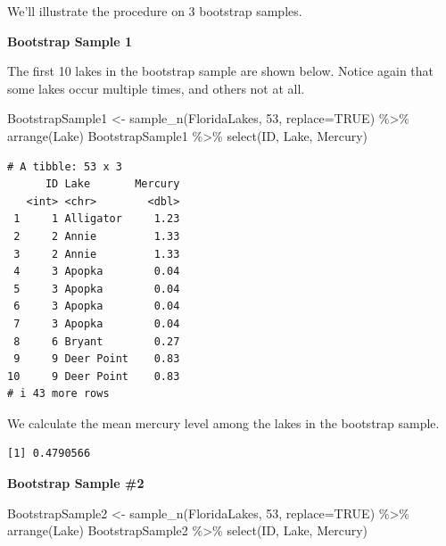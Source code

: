 \documentclass[
  letterpaper,
  DIV=11,
  numbers=noendperiod]{scrreprt}
\newenvironment{Shaded}{\begin{snugshade}}{\end{snugshade}}
\newcommand{\AttributeTok}[1]{\textcolor[rgb]{0.40,0.45,0.13}{#1}}
\newcommand{\ConstantTok}[1]{\textcolor[rgb]{0.56,0.35,0.01}{#1}}
\newcommand{\DecValTok}[1]{\textcolor[rgb]{0.68,0.00,0.00}{#1}}
\newcommand{\FunctionTok}[1]{\textcolor[rgb]{0.28,0.35,0.67}{#1}}
\newcommand{\NormalTok}[1]{\textcolor[rgb]{0.00,0.23,0.31}{#1}}
\newcommand{\OtherTok}[1]{\textcolor[rgb]{0.00,0.23,0.31}{#1}}
\newcommand{\SpecialCharTok}[1]{\textcolor[rgb]{0.37,0.37,0.37}{#1}}
\begin{document}
We'll illustrate the procedure on 3 bootstrap samples.

\textbf{Bootstrap Sample 1}

The first 10 lakes in the bootstrap sample are shown below. Notice again
that some lakes occur multiple times, and others not at all.

\begin{Shaded}
\begin{Highlighting}[]
\NormalTok{BootstrapSample1 }\OtherTok{\textless{}{-}} \FunctionTok{sample\_n}\NormalTok{(FloridaLakes, }\DecValTok{53}\NormalTok{, }\AttributeTok{replace=}\ConstantTok{TRUE}\NormalTok{) }\SpecialCharTok{\%\textgreater{}\%} \FunctionTok{arrange}\NormalTok{(Lake)}
\NormalTok{BootstrapSample1 }\SpecialCharTok{\%\textgreater{}\%} \FunctionTok{select}\NormalTok{(ID, Lake, Mercury)}
\end{Highlighting}
\end{Shaded}

\begin{verbatim}
# A tibble: 53 x 3
      ID Lake       Mercury
   <int> <chr>        <dbl>
 1     1 Alligator     1.23
 2     2 Annie         1.33
 3     2 Annie         1.33
 4     3 Apopka        0.04
 5     3 Apopka        0.04
 6     3 Apopka        0.04
 7     3 Apopka        0.04
 8     6 Bryant        0.27
 9     9 Deer Point    0.83
10     9 Deer Point    0.83
# i 43 more rows
\end{verbatim}

We calculate the mean mercury level among the lakes in the bootstrap
sample.

\begin{Shaded}
\end{Shaded}

\begin{verbatim}
[1] 0.4790566
\end{verbatim}

\textbf{Bootstrap Sample \#2}

\begin{Shaded}
\begin{Highlighting}[]
\NormalTok{BootstrapSample2 }\OtherTok{\textless{}{-}} \FunctionTok{sample\_n}\NormalTok{(FloridaLakes, }\DecValTok{53}\NormalTok{, }\AttributeTok{replace=}\ConstantTok{TRUE}\NormalTok{) }\SpecialCharTok{\%\textgreater{}\%} \FunctionTok{arrange}\NormalTok{(Lake)}
\NormalTok{BootstrapSample2 }\SpecialCharTok{\%\textgreater{}\%} \FunctionTok{select}\NormalTok{(ID, Lake, Mercury)}
\end{Highlighting}
\end{Shaded}
\end{document}
